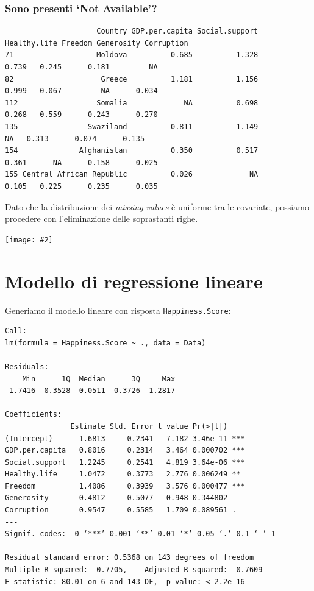 \documentclass{beamer}
\newcommand{\fg}[2]{%
  \begin{center}
      \texttt{[image: \#2]}%
  \end{center}
}
\begin{document}
\begin{frame}[fragile]
    \frametitle{Sono presenti `Not Available'?}
    \tiny
    \begin{verbatim}
                     Country GDP.per.capita Social.support Healthy.life Freedom Generosity Corruption
71                   Moldova          0.685          1.328        0.739   0.245      0.181         NA
82                    Greece          1.181          1.156        0.999   0.067         NA      0.034
112                  Somalia             NA          0.698        0.268   0.559      0.243      0.270
135                Swaziland          0.811          1.149           NA   0.313      0.074      0.135
154              Afghanistan          0.350          0.517        0.361      NA      0.158      0.025
155 Central African Republic          0.026             NA        0.105   0.225      0.235      0.035
    \end{verbatim}

    \normalsize Dato che la distribuzione dei \textit{missing values} è uniforme tra le covariate, possiamo procedere con l'eliminazione delle soprastanti righe.
\end{frame}

\begin{frame}
    \fg{1}{ggpairs1}
\end{frame}


\section{Modello di regressione lineare}

\begin{frame}[fragile]
	Generiamo il modello lineare con risposta \texttt{Happiness.Score}:

	\tiny
	\begin{verbatim}
Call:
lm(formula = Happiness.Score ~ ., data = Data)

Residuals:
    Min      1Q  Median      3Q     Max 
-1.7416 -0.3528  0.0511  0.3726  1.2817 

Coefficients:
               Estimate Std. Error t value Pr(>|t|)    
(Intercept)      1.6813     0.2341   7.182 3.46e-11 ***
GDP.per.capita   0.8016     0.2314   3.464 0.000702 ***
Social.support   1.2245     0.2541   4.819 3.64e-06 ***
Healthy.life     1.0472     0.3773   2.776 0.006249 ** 
Freedom          1.4086     0.3939   3.576 0.000477 ***
Generosity       0.4812     0.5077   0.948 0.344802    
Corruption       0.9547     0.5585   1.709 0.089561 .  
---
Signif. codes:  0 ‘***’ 0.001 ‘**’ 0.01 ‘*’ 0.05 ‘.’ 0.1 ‘ ’ 1

Residual standard error: 0.5368 on 143 degrees of freedom
Multiple R-squared:  0.7705,    Adjusted R-squared:  0.7609 
F-statistic: 80.01 on 6 and 143 DF,  p-value: < 2.2e-16
	\end{verbatim}
\end{frame}
\end{document}
